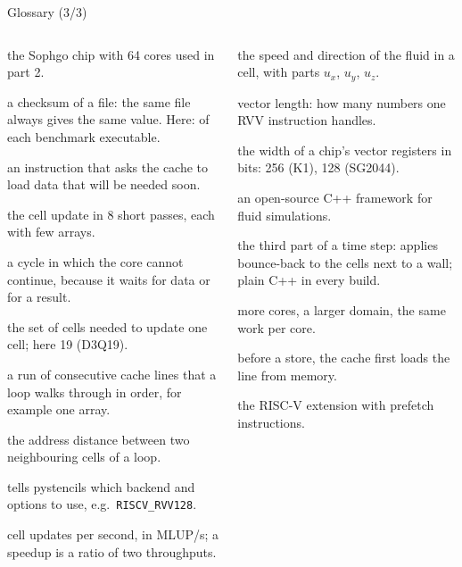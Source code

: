 \documentclass[aspectratio=169,10pt,t]{beamer}
\newcommand{\code}[1]{\texttt{#1}}
\begin{document}
\begin{frame}{Glossary (3/3)}
  \begin{columns}[T,onlytextwidth]
    \scriptsize
    \begin{description}\setlength{\itemsep}{0.8pt}
      \item[SG2044] the Sophgo chip with 64 cores used in part 2.
      \item[sha256] a checksum of a file: the same file always gives the same value. Here: of each benchmark executable.
      \item[Software prefetch] an instruction that asks the cache to load data that will be needed soon.
      \item[Split loop] the cell update in 8 short passes, each with few arrays.
      \item[Stall] a cycle in which the core cannot continue, because it waits for data or for a result.
      \item[Stencil] the set of cells needed to update one cell; here 19 (D3Q19).
      \item[Stream] a run of consecutive cache lines that a loop walks through in order, for example one array.
      \item[Stride] the address distance between two neighbouring cells of a loop.
      \item[Target] tells pystencils which backend and options to use, e.g.\ \code{RISCV\_RVV128}.
      \item[Throughput] cell updates per second, in MLUP/s; a speedup is a ratio of two throughputs.
    \end{description}
    \scriptsize
    \begin{description}\setlength{\itemsep}{0.8pt}
      \item[Velocity $u$] the speed and direction of the fluid in a cell, with parts $u_x$, $u_y$, $u_z$.
      \item[vl] vector length: how many numbers one RVV instruction handles.
      \item[VLEN] the width of a chip's vector registers in bits: 256 (K1), 128 (SG2044).
      \item[waLBerla] an open-source C++ framework for fluid simulations.
      \item[Wall pass] the third part of a time step: applies bounce-back to the cells next to a wall; plain C++ in every build.
      \item[Weak scaling] more cores, a larger domain, the same work per core.
      \item[Write-allocate] before a store, the cache first loads the line from memory.
      \item[Zicbop] the RISC-V extension with prefetch instructions.
    \end{description}
  \end{columns}
\end{frame}
\end{document}

